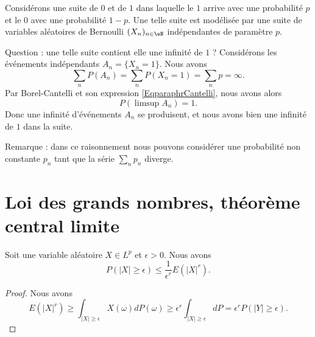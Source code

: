\begin{example}
    Considérons une suite de \( 0\) et de \( 1\) dans laquelle le \( 1\) arrive avec une probabilité \( p\) et le \( 0\) avec une probabilité \( 1-p\). Une telle suite est modélisée par une suite de variables aléatoires de Bernoulli \( (X_n)_{n\in\eN}\) indépendantes de paramètre \( p\).

    Question : une telle suite contient elle une infinité de \( 1\) ? Considérons les événements indépendants \( A_n=\{ X_n=1 \}\). Nous avons
    \begin{equation}
        \sum_n P(A_n)=\sum_nP(X_n=1)=\sum_np=\infty.
    \end{equation}
    Par Borel-Cantelli et son expression \eqref{EqparaphrCantelli}, nous avons alors
    \begin{equation}
        P(\limsup A_n)=1.
    \end{equation}
    Donc une infinité d'événements \( A_n\) se produisent, et nous avons bien une infinité de \( 1\) dans la suite.

    Remarque : dans ce raisonnement nous pouvons considérer une probabilité non constante \( p_n\) tant que la série \( \sum_np_n\) diverge.
\end{example}

\section{Loi des grands nombres, théorème central limite}

\begin{lemma}
    Soit une variable aléatoire \( X\in L^p\) et \( \epsilon>0\). Nous avons
    \begin{equation}
        P(| X |\geq \epsilon)\leq \frac{1}{ \epsilon^r }E(| X |^r).
    \end{equation}
\end{lemma}

\begin{proof}
    Nous avons
    \begin{equation}
        E(| X |^r)\geq\int_{| X |\geq \epsilon}X(\omega)dP(\omega)\geq \epsilon^r\int_{| X |\geq\epsilon}dP=\epsilon^rP(| Y |\geq\epsilon).
    \end{equation}
\end{proof}


